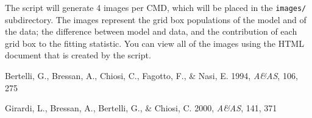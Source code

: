\documentclass[12pt]{book}
\def\aaps{{\it A\&AS}}
\def\ttg{\tt\color{DarkGreen}}
\begin{document}
\medskip
The script will generate 4 images per CMD, which will be placed in the 
{\ttg images/} subdirectory.  The images represent the grid box 
populations of the model and of the data; the difference between model 
and data, and the contribution of each grid box to the fitting 
statistic.  You can view all of the images using the HTML document 
that is created by the script.


\begin{thebibliography}{75}

{Bertelli}, G., {Bressan}, A., {Chiosi}, C., {Fagotto}, F., \& {Nasi}, E. 1994,
  \aaps, 106, 275

{Girardi}, L., {Bressan}, A., {Bertelli}, G., \& {Chiosi}, C. 2000,
  \aaps, 141, 371
  
\end{thebibliography}
\end{document}
